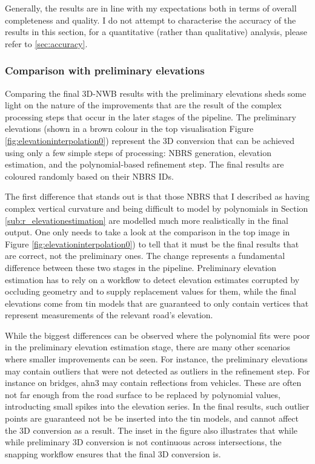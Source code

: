 Generally, the results are in line with my expectations both in terms of overall completeness and quality. I do not attempt to characterise the accuracy of the results in this section, for a quantitative (rather than qualitative) analysis, please refer to \ref{sec:accuracy}.

\subsubsection{Comparison with preliminary elevations}

Comparing the final 3D-NWB results with the preliminary elevations sheds some light on the nature of the improvements that are the result of the complex processing steps that occur in the later stages of the pipeline. The preliminary elevations (shown in a brown colour in the top visualisation Figure \ref{fig:elevationinterpolation0}) represent the 3D conversion that can be achieved using only a few simple steps of processing: NBRS generation, elevation estimation, and the polynomial-based refinement step. The final results are coloured randomly based on their NBRS IDs.

The first difference that stands out is that those NBRS that I described as having complex vertical curvature and being difficult to model by polynomials in Section \ref{sub:r_elevationestimation} are modelled much more realistically in the final output. One only needs to take a look at the comparison in the top image in Figure \ref{fig:elevationinterpolation0}) to tell that it must be the final results that are correct, not the preliminary ones. The change represents a fundamental difference between these two stages in the pipeline. Preliminary elevation estimation has to rely on a workflow to detect elevation estimates corrupted by occluding geometry and to supply replacement values for them, while the final elevations come from \ac{tin} models that are guaranteed to only contain vertices that represent measurements of the relevant road's elevation.

While the biggest differences can be observed where the polynomial fits were poor in the preliminary elevation estimation stage, there are many other scenarios where smaller improvements can be seen. For instance, the preliminary elevations may contain outliers that were not detected as outliers in the refinement step. For instance on bridges, \ac{ahn3} may contain reflections from vehicles. These are often not far enough from the road surface to be replaced by polynomial values, introducting small spikes into the elevation series. In the final results, such outlier points are guaranteed not be be inserted into the \ac{tin} models, and cannot affect the 3D conversion as a result. The inset in the figure also illustrates that while while preliminary 3D conversion is not continuous across intersections, the snapping workflow ensures that the final 3D conversion is.

